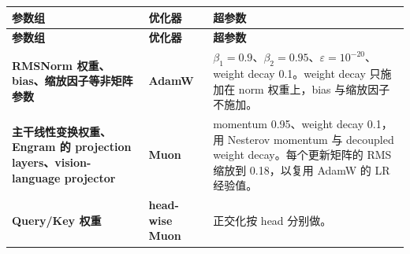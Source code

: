 \documentclass[zihao=false,fontset=windows]{ctexart}
\begin{document}
\begin{longtable}{|>{\raggedright\arraybackslash}p{4.6cm}|>{\raggedright\arraybackslash}p{4.6cm}|>{\raggedright\arraybackslash}p{4.6cm}|}\hline
\rowcolor{tableHead} 
\textbf{参数组}\par
 & 
\textbf{优化器}\par
 & 
\textbf{超参数}\par
 \\ \hline
\endfirsthead
\hline\rowcolor{tableHead} 
\textbf{参数组}\par
 & 
\textbf{优化器}\par
 & 
\textbf{超参数}\par
 \\ \hline
\endhead

\textbf{RMSNorm 权重、bias、缩放因子等非矩阵参数}\par
 & 
\textbf{AdamW}\par
 & 
$\beta_1=0.9$、$\beta_2=0.95$、$\varepsilon=10^{-20}$、weight decay 0.1。weight decay 只施加在 norm 权重上，bias 与缩放因子不施加。\par
 \\ \hline

\textbf{主干线性变换权重、Engram 的 projection layers、vision-language projector}\par
 & 
\textbf{Muon}\par

 & 
momentum 0.95、weight decay 0.1，用 Nesterov momentum 与 decoupled weight decay。每个更新矩阵的 RMS 缩放到 0.18，以复用 AdamW 的 LR 经验值。\par
 \\ \hline

\textbf{Query/Key 权重}\par
 & 
\textbf{head-wise Muon}\par
 & 
正交化按 head 分别做。\par
 \\ \hline


\end{longtable}
\end{document}
